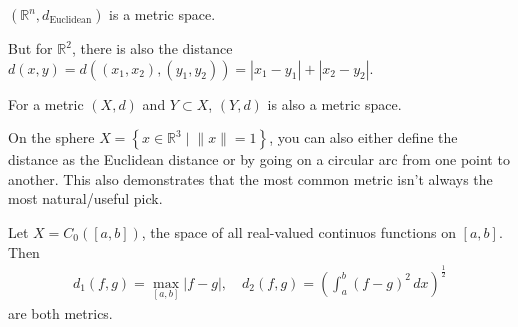 \begin{eg}
	$(\mathbb{R}^{n}, d_{\text{Euclidean}})$ is a metric space.

	But for $\mathbb{R}^{2}$, there is also the distance $d(x,y) = d((x_{1}, x_{2}), (y_{1}, y_{2})) = \left| x_{1} - y_{1} \right|
		+ \left| x_{2} - y_{2} \right|$.

    For a metric $(X,d)$ and $Y \subset X$, $(Y,d)$ is also a metric space.

    On the sphere $X = \left\{ x \in \mathbb{R}^{3} \mid \lVert x \rVert = 1 \right\}$, you can also either define the distance as the Euclidean distance or by going on a circular arc from one point to another. This also demonstrates that the most common metric isn't always the most natural/useful pick.

    Let $X = C_{0}([a,b])$, the space of all real-valued continuos functions on $[a,b]$. Then
    \begin{align*}
        d_{1}(f,g) = \max_{[a,b]} \left| f - g \right| , \quad d_{2}(f,g) = \left( \int_{a}^{b} (f-g)^{2} \, dx \right)^{\frac{1}{2}}
    \end{align*}
	are both metrics.
\end{eg}

